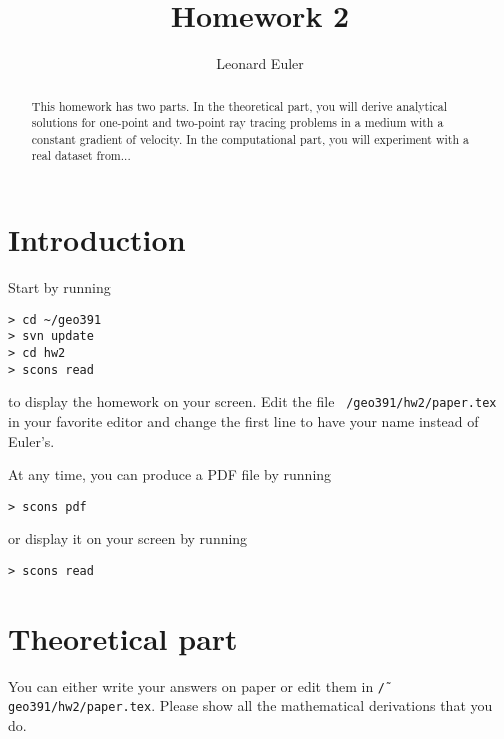 \author{Leonard Euler} 
\title{Homework 2}

\begin{abstract}
This homework has two parts. In the theoretical part, you will derive
analytical solutions for one-point and two-point ray tracing
problems in a medium with a constant gradient of velocity. In the
computational part, you will experiment with a real dataset from...
\end{abstract}

\section{Introduction}

Start by running
\begin{verbatim}
> cd ~/geo391
> svn update
> cd hw2
> scons read
\end{verbatim}
to display the homework on your screen. Edit the file
\texttt{~/geo391/hw2/paper.tex} in your favorite editor and change the
first line to have your name instead of Euler's. 

At any time, you can
produce a PDF file by running
\begin{verbatim}
> scons pdf
\end{verbatim}
or display it on your screen by running
\begin{verbatim}
> scons read
\end{verbatim}

\section{Theoretical part}

You can either write your answers on paper or edit them in
\texttt{\~/geo391/hw2/paper.tex}. Please show all the mathematical derivations that
you do.

